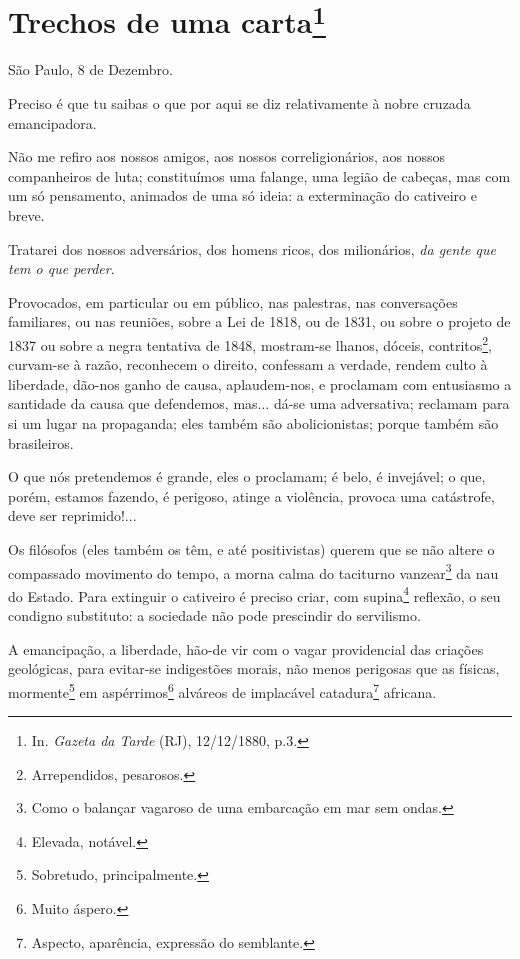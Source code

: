 \chapter{Trechos de uma carta\footnote[*]{In. \emph{Gazeta da Tarde}
  (RJ), 12/12/1880, p.3.}}

São Paulo, 8 de Dezembro.

Preciso é que tu saibas o que por aqui se diz relativamente à nobre
cruzada emancipadora.

Não me refiro aos nossos amigos, aos nossos correligionários, aos nossos
companheiros de luta; constituímos uma falange, uma legião de cabeças,
mas com um só pensamento, animados de uma só ideia: a exterminação do
cativeiro e breve.

Tratarei dos nossos adversários, dos homens ricos, dos milionários,
\emph{da gente que tem o que perder}.

Provocados, em particular ou em público, nas palestras, nas conversações
familiares, ou nas reuniões, sobre a Lei de 1818, ou de 1831, ou sobre o
projeto de 1837 ou sobre a negra tentativa de 1848, mostram-se lhanos,
dóceis, contritos\footnote{Arrependidos, pesarosos.}, curvam-se à
razão, reconhecem o direito, confessam a verdade, rendem culto à
liberdade, dão-nos ganho de causa, aplaudem-nos, e proclamam com
entusiasmo a santidade da causa que defendemos, mas... dá-se uma
adversativa; reclamam para si um lugar na propaganda; eles também são
abolicionistas; porque também são brasileiros.

O que nós pretendemos é grande, eles o proclamam; é belo, é invejável; o
que, porém, estamos fazendo, é perigoso, atinge a violência, provoca uma
catástrofe, deve ser reprimido!...

Os filósofos (eles também os têm, e até positivistas) querem que se não
altere o compassado movimento do tempo, a morna calma do taciturno
vanzear\footnote{Como o balançar vagaroso de uma embarcação em mar sem
  ondas.} da nau do Estado. Para extinguir o cativeiro é preciso criar,
com supina\footnote{Elevada, notável.} reflexão, o seu condigno
substituto: a sociedade não pode prescindir do servilismo.

A emancipação, a liberdade, hão-de vir com o vagar providencial das
criações geológicas, para evitar-se indigestões morais, não menos
perigosas que as físicas, mormente\footnote{Sobretudo, principalmente.}
em aspérrimos\footnote{Muito áspero.} alváreos de implacável
catadura\footnote{Aspecto, aparência, expressão do semblante.}
africana.

